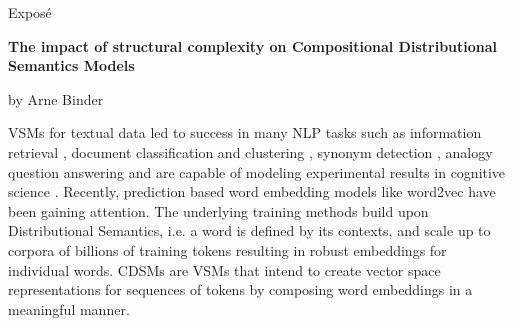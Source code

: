 
\begin{center}
	\huge{Expos\'e} 
	\vspace{0.5cm}
	 
	\large{\bf{The impact of structural complexity on Compositional Distributional Semantics Models 
			}} 
	\vspace{0.5cm}

	by Arne Binder \\
\end{center}

\vspace{0.5cm}
\normalsize

\acfp{VSM} for textual data \autocite{salton_vector_1975} led to success in many \ac{NLP} tasks %
such as information retrieval \autocite{dierk_smart_1971,deerwester_indexing_1990}, document classification and clustering , synonym detection \autocite{rapp_word_2003}, analogy question answering \autocite{turney_similarity_2006} and are capable of modeling experimental results in cognitive science \autocite{landauer_solution_1997,mcdonald_testing_2001}.
Recently, prediction based word embedding models like word2vec \autocite{mikolov_efficient_2013} have been gaining attention. %
The underlying training methods build upon Distributional Semantics, i.e. a word is defined by its contexts, and scale up to %
corpora of billions of training tokens \autocite{mikolov_distributed_2013} resulting in robust embeddings for individual words. 
\acfp{CDSM} are \acp{VSM} that intend to create vector space representations for sequences of tokens by composing word embeddings in a meaningful manner. 

